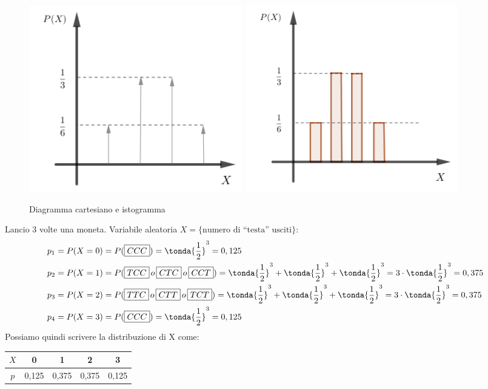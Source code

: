 \begin{figure}[htpb!]
  \centering
  \includegraphics[width=0.45\textwidth]{img/diagramma.png}
  \includegraphics[width=0.45\textwidth]{img/istogramma.png}
  \caption{Diagramma cartesiano e istogramma}
\end{figure}

\begin{esempio} Lancio 3 volte una moneta. 
Variabile aleatoria \(X = \{\text{numero di ``testa'' usciti}\}\):
\[\begin{split}
p_1 &= P(X=0) = P(\text{\boxed{CCC}}) = \tonda{\dfrac{1}{2}}^3 = 0,125 \\
p_2 &= P(X=1) = P(\text{\boxed{TCC}}\, o\, 
                  \text{\boxed{CTC}} \, o\, 
                  \text{\boxed{CCT}}) = 
\tonda{\dfrac{1}{2}}^3 + \tonda{\dfrac{1}{2}}^3 + \tonda{\dfrac{1}{2}}^3= 
3\cdot \tonda{\dfrac{1}{2}}^3 = 0,375 \\
p_3 &= P(X=2) = P(\text{\boxed{TTC}} \, o\, 
                  \text{\boxed{CTT}}\, o\, \text{\boxed{TCT}}) = 
\tonda{\dfrac{1}{2}}^3 + \tonda{\dfrac{1}{2}}^3 + \tonda{\dfrac{1}{2}}^3= 
3 \cdot \tonda{\dfrac{1}{2}}^3 = 0,375 \\
p_4 &= P(X=3) = P(\text{\boxed{CCC}}) = \tonda{\dfrac{1}{2}}^3 = 0,125 \\
 \end{split}\]
 Possiamo quindi scrivere la distribuzione di X come: \quad 
 \renewcommand\arraystretch{1.4}
\setlength\arraycolsep{25pt}
\begin{tabular}{c|c|c|c|c}
\(X\) & 0 & 1 & 2 & 3\\
\hline
\(p\) & 0,125 & 0,375 & 0,375 & 0,125\\
\end{tabular}
\end{esempio}

